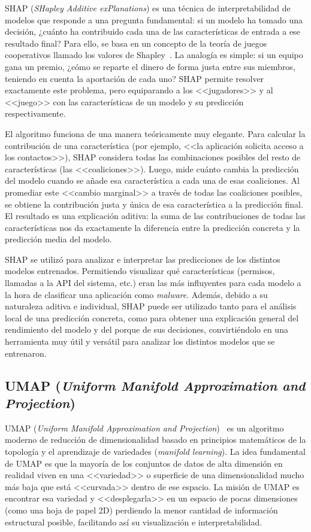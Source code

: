 
SHAP (\textit{SHapley Additive exPlanations}) es una técnica de interpretabilidad de modelos que responde a una pregunta fundamental: si un modelo ha tomado una decisión, ¿cuánto ha contribuido cada una de las características de entrada a ese resultado final? Para ello, se basa en un concepto de la teoría de juegos cooperativos llamado los valores de Shapley~\cite{lundberg2017unified}. La analogía es simple: si un equipo gana un premio, ¿cómo se reparte el dinero de forma justa entre sus miembros, teniendo en cuenta la aportación de cada uno? SHAP permite resolver exactamente este problema, pero equiparando a los <<jugadores>> y al <<juego>> con las características de un modelo y su predicción respectivamente.

El algoritmo funciona de una manera teóricamente muy elegante. Para calcular la contribución de una característica (por ejemplo, <<la aplicación solicita acceso a los contactos>>), SHAP considera todas las combinaciones posibles del resto de características (las <<coaliciones>>). Luego, mide cuánto cambia la predicción del modelo cuando se añade esa característica a cada una de esas coaliciones. Al promediar este <<cambio marginal>> a través de todas las coaliciones posibles, se obtiene la contribución justa y única de esa característica a la predicción final. El resultado es una explicación aditiva: la suma de las contribuciones de todas las características nos da exactamente la diferencia entre la predicción concreta y la predicción media del modelo.

SHAP se utilizó para analizar e interpretar las predicciones de los distintos modelos entrenados. Permitiendo visualizar qué características (permisos, llamadas a la API del sistema, etc.) eran las más influyentes para cada modelo a la hora de clasificar una aplicación como \textit{malware}. Además, debido a su naturaleza aditiva e individual, SHAP puede ser utilizado tanto para el análisis local de una predicción concreta, como para obtener una explicación general del rendimiento del modelo y del porque de sus decisiones, convirtiéndolo en una herramienta muy útil y versátil para analizar los distintos modelos que se entrenaron.

\subsection{UMAP (\textit{Uniform Manifold Approximation and Projection})}

UMAP (\textit{Uniform Manifold Approximation and Projection})~\cite{mcinnes2018umap} es un algoritmo moderno de reducción de dimensionalidad basado en principios matemáticos de la topología y el aprendizaje de variedades (\textit{manifold learning}). La idea fundamental de UMAP es que la mayoría de los conjuntos de datos de alta dimensión en realidad viven en una <<variedad>> o superficie de una dimensionalidad mucho más baja que está <<curvada>> dentro de ese espacio. La misión de UMAP es encontrar esa variedad y <<desplegarla>> en un espacio de pocas dimensiones (como una hoja de papel 2D) perdiendo la menor cantidad de información estructural posible, facilitando así su visualización e interpretabilidad.

